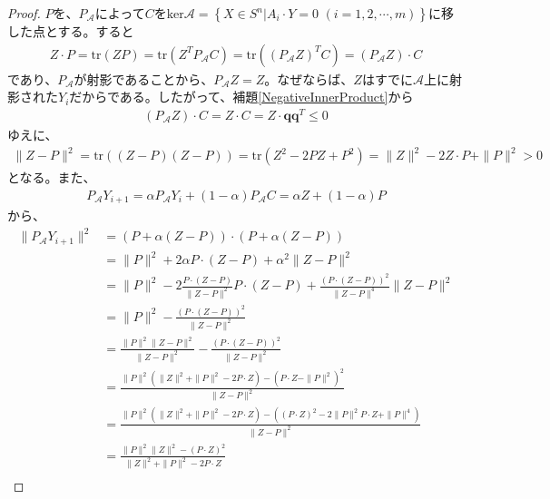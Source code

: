 \begin{proof}
  $P$を、$P_\mathcal{A}$によって$C$を$\mathrm{ker} \mathcal{A} = \left\{X \in S^n | A_i \cdot Y = 0 \,\,(i = 1, 2, \cdots, m)\right\}$に移した点とする。すると
  \begin{align*}
    Z \cdot P = \mathrm{tr}(Z P) = \mathrm{tr}(Z^T P_\mathcal{A} C) = \mathrm{tr}((P_\mathcal{A} Z)^T C) = (P_\mathcal{A} Z) \cdot C
  \end{align*}
  であり、$P_\mathcal{A}$が射影であることから、$P_\mathcal{A} Z = Z$。なぜならば、$Z$はすでに$\mathcal{A}$上に射影された$Y_i$だからである。したがって、補題\ref{NegativeInnerProduct}から
  \begin{align*}
    (P_\mathcal{A} Z) \cdot C = Z \cdot C = Z \cdot \mathbf{q} \mathbf{q}^T \leq 0
  \end{align*}
  ゆえに、
  \begin{align*}
    \|Z - P\|^2 = \mathrm{tr}((Z - P)(Z - P)) = \mathrm{tr}(Z^2 - 2 P Z + P^2) = \|Z\|^2 - 2 Z \cdot P + \|P\|^2 > 0
  \end{align*}
  となる。また、
  \begin{align*}
    P_\mathcal{A} Y_{i + 1} = \alpha P_\mathcal{A} Y_i + (1 - \alpha) P_\mathcal{A} C = \alpha Z + (1 - \alpha) P
  \end{align*}
  から、
  \begin{align*}
    \|P_\mathcal{A} Y_{i + 1}\|^2 & = (P + \alpha (Z - P)) \cdot (P + \alpha (Z - P)) \\
                                  & = \|P\|^2 + 2 \alpha P \cdot (Z - P) + \alpha^2 \|Z - P\|^2 \\
                                  & = \|P\|^2 - 2 \frac{P \cdot (Z - P)}{\|Z - P\|^2} P \cdot (Z - P) + \frac{(P \cdot (Z - P))^2}{\|Z - P\|^4} \|Z - P\|^2 \\
                                  & = \|P\|^2 - \frac{(P \cdot (Z - P))^2}{\|Z - P\|^2} \\
                                  & = \frac{\|P\|^2 \|Z - P\|^2}{\|Z - P\|^2} - \frac{(P \cdot (Z - P))^2}{\|Z - P\|^2} \\
                                  & = \frac{\|P\|^2 (\|Z\|^2 + \|P\|^2 - 2 P \cdot Z) - (P \cdot Z - \|P\|^2)^2}{\|Z - P\|^2} \\
                                  & = \frac{\|P\|^2 (\|Z\|^2 + \|P\|^2 - 2 P \cdot Z) - ((P \cdot Z)^2 - 2 \|P\|^2 P \cdot Z + \|P\|^4)}{\|Z - P\|^2} \\
                                  & = \frac{\|P\|^2 \|Z\|^2 - (P \cdot Z)^2}{\|Z\|^2 + \|P\|^2 - 2 P \cdot Z} \\

\end{align*}
\end{proof}
